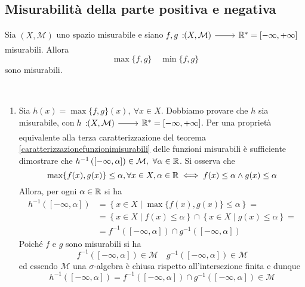 \subsection{Misurabilità della parte positiva e negativa}\label{misuraparterealeimm}
\begin{proposition}
	Sia $ \left(X,\mathcal{M}\right)$ uno spazio misurabile e siano $\funz{f,g}{\left(X,\mathcal{M}\right)}{\realset^{\ast}=\left[-\infty,+\infty\right]}$ misurabili.
	Allora
	\begin{equation*}
		\max\{f,g\}\quad\min\{f,g\}
	\end{equation*}
	sono misurabili.
\end{proposition}
\begin{demonstration}~{}
	\begin{enumerate}
		\item Sia $ h(x)=\max\{f,g\}(x),\ \forall x\in X$. Dobbiamo provare che $h$ sia misurabile, con $\funz{h}{\left(X,\mathcal{M}\right)}{\realset^{\ast}=\left[-\infty,+\infty\right]}$. Per una proprietà equivalente alla terza caratterizzazione del teorema \ref{caratterizzazionefunzionimisurabili} delle funzioni misurabili è sufficiente dimostrare che $h^{-1}\left(\left[-\infty,\alpha\right]\right)\in\mathcal{M},\ \forall\alpha\in\realset$.
		Si osserva che
		\begin{equation*}
			\max\{f(x),g(x)\}\leq\alpha, \forall x\in X, \alpha\in\mathbb{R}\iff f(x)\leq \alpha\wedge g(x)\leq \alpha
		\end{equation*}
	Allora, per ogni $\alpha\in\mathbb{R}$ si ha
	\begin{align*}
		h^{-1}\left(\left[-\infty,\alpha\right]\right)&=\left\{x\in X\mid \max\{f(x),g(x)\}\leq\alpha\right\}=\\
		&=\left\{x\in X\mid f(x)\leq \alpha\right\}\cap\left\{x\in X\mid g(x)\leq\alpha\right\}=\\
		&=f^{-1}\left(\left[-\infty,\alpha\right]\right)\cap g^{-1}\left(\left[-\infty,\alpha\right]\right)
	\end{align*}
	Poiché $f$ e $g$ sono misurabili si ha
	\begin{equation*}
	f^{-1}\left(\left[-\infty,\alpha\right]\right)\in\mathcal{M}\quad g^{-1}\left(\left[-\infty,\alpha\right]\right)\in\mathcal{M}
	\end{equation*}
	ed essendo $\mathcal{M}$ una $\sigma$-algebra è chiusa rispetto all'intersezione finita e dunque
	\begin{equation*}
		h^{-1}\left(\left[-\infty,\alpha\right]\right)=f^{-1}\left(\left[-\infty,\alpha\right]\right)\cap g^{-1}\left(\left[-\infty,\alpha\right]\right)\in\mathcal{M}

\end{equation*}
\end{enumerate}
\end{demonstration}
